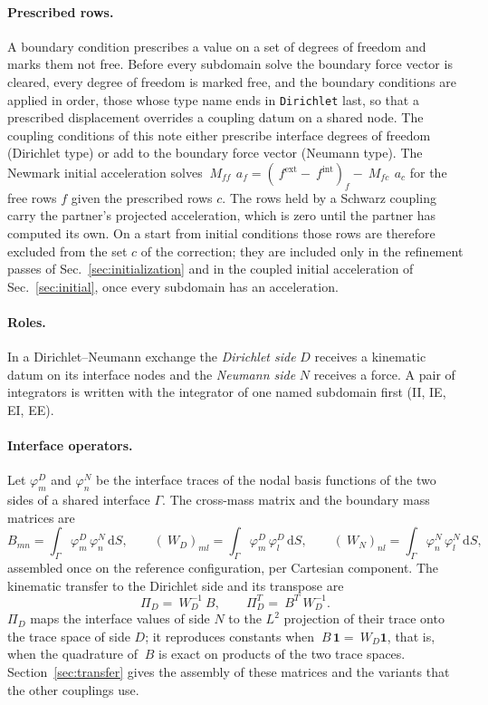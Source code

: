 \documentclass[11pt]{article}
\newcommand{\dd}{\mathrm{d}}
\newcommand{\code}[1]{\texttt{#1}}
\begin{document}
\paragraph{Prescribed rows.} A boundary condition prescribes a value on a
set of degrees of freedom and marks them not free. Before every subdomain
solve the boundary force vector is cleared, every degree of freedom is
marked free, and the boundary conditions are applied in order, those whose
type name ends in \code{Dirichlet} last, so that a prescribed displacement
overrides a coupling datum on a shared node. The coupling conditions of
this note either prescribe interface degrees of freedom (Dirichlet type) or
add to the boundary force vector (Neumann type). The Newmark initial
acceleration solves $~M_{ff}\, ~a_f = (~f^{\mathrm{ext}} - ~f^{\mathrm{int}})_f -
~M_{fc}\, ~a_c$ for the free rows $f$ given the prescribed rows $c$. The
rows held by a Schwarz coupling carry the partner's projected
acceleration, which is zero until the partner has computed its own. On a
start from initial conditions those rows are therefore excluded from the
set $c$ of the correction; they are included only in the refinement passes of
Sec.~\ref{sec:initialization} and in the coupled initial acceleration of
Sec.~\ref{sec:initial}, once every subdomain has an acceleration.

\paragraph{Roles.} In a Dirichlet--Neumann exchange the \emph{Dirichlet
side} $D$ receives a kinematic datum on its interface nodes and the
\emph{Neumann side} $N$ receives a force. A pair of integrators is written
with the integrator of one named subdomain first (II, IE, EI, EE).

\paragraph{Interface operators.} Let $\varphi^D_m$ and $\varphi^N_n$ be the
interface traces of the nodal basis functions of the two sides of a shared
interface $\Gamma$. The cross-mass matrix and the boundary mass matrices are
\begin{equation}
  B_{mn} = \int_\Gamma \varphi^D_m\, \varphi^N_n \,\dd S, \qquad
  (~W_D)_{ml} = \int_\Gamma \varphi^D_m\, \varphi^D_l \,\dd S, \qquad
  (~W_N)_{nl} = \int_\Gamma \varphi^N_n\, \varphi^N_l \,\dd S,
  \label{eq:cross-mass}
\end{equation}
assembled once on the reference configuration, per Cartesian component.
The kinematic transfer to the Dirichlet side and its transpose are
\begin{equation}
  \Pi_D = ~W_D^{-1} ~B, \qquad \Pi_D^T = ~B^T ~W_D^{-1} .
  \label{eq:projector}
\end{equation}
$\Pi_D$ maps the interface values of side $N$ to the $L^2$ projection of
their trace onto the trace space of side $D$; it reproduces constants when
$~B\,\mathbf{1} = ~W_D \mathbf{1}$, that is, when the quadrature of $~B$ is
exact on products of the two trace spaces. Section~\ref{sec:transfer}
gives the assembly of these matrices and the variants that the other
couplings use.
\end{document}
